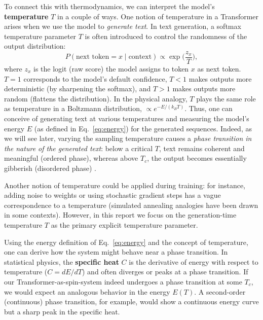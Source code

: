 \documentclass[12pt]{article}
\begin{document}
To connect this with thermodynamics, we can interpret the model's \textbf{temperature} $T$ in a couple of ways. One notion of temperature in a Transformer arises when we use the model to \emph{generate text}. In text generation, a softmax temperature parameter $T$ is often introduced to control the randomness of the output distribution:
\[ P(\text{next token}=x \mid \text{context}) \propto \exp\!\bigg(\frac{z_x}{T}\bigg), \] 
where $z_x$ is the logit (raw score) the model assigns to token $x$ as next token. $T=1$ corresponds to the model’s default confidence, $T<1$ makes outputs more deterministic (by sharpening the softmax), and $T>1$ makes outputs more random (flattens the distribution). In the physical analogy, $T$ plays the same role as temperature in a Boltzmann distribution, $\propto e^{-E/(k_B T)}$. Thus, one can conceive of generating text at various temperatures and measuring the model’s energy $E$ (as defined in Eq.~\eqref{eq:energy}) for the generated sequences. Indeed, as we will see later, varying the sampling temperature causes a \emph{phase transition in the nature of the generated text}: below a critical $T$, text remains coherent and meaningful (ordered phase), whereas above $T_c$, the output becomes essentially gibberish (disordered phase) \citep{sun2025}.

Another notion of temperature could be applied during training: for instance, adding noise to weights or using stochastic gradient steps has a vague correspondence to a temperature (simulated annealing analogies have been drawn in some contexts). However, in this report we focus on the generation-time temperature $T$ as the primary explicit temperature parameter.

Using the energy definition of Eq.~\eqref{eq:energy} and the concept of temperature, one can derive how the system might behave near a phase transition. In statistical physics, the \textbf{specific heat} $C$ is the derivative of energy with respect to temperature ($C = dE/dT$) and often diverges or peaks at a phase transition. If our Transformer-as-spin-system indeed undergoes a phase transition at some $T_c$, we would expect an analogous behavior in the energy $E(T)$. A second-order (continuous) phase transition, for example, would show a continuous energy curve but a sharp peak in the specific heat.
\end{document}
